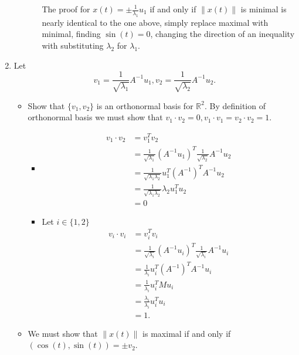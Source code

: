 \documentclass[12pt, letterpaper]{article}
\newcommand{\R}{\mathbb{R}}
\begin{document}
\begin{enumerate}
\begin{itemize}
\begin{itemize}
		The proof for $x(t) = \pm \frac{1}{\lambda_1} u_1$ if and only if $\|x(t)\|$ is minimal is nearly identical to the one above, simply replace maximal with minimal, finding $\sin(t) = 0$, changing the direction of an inequality with substituting $\lambda_2$ for $\lambda_1$.  

			\end{itemize}
		\end{itemize}
		\item Let $$v_1 = \frac{1}{\sqrt{\lambda_1}} A^{-1}u_1, v_2 = \frac{1}{\sqrt{\lambda_2}} A^{-1}u_2.$$
		\begin{itemize}
			\item Show that $\{v_1, v_2\}$ is an orthonormal basis for $\R^2$.  By definition of orthonormal basis we must show that $v_1 \cdot v_2 = 0, v_1 \cdot v_1 = v_2 \cdot v_2 = 1.$
			\begin{itemize}
				\item \begin{align*}
					v_1 \cdot v_2 &= v_1^T v_2\\
					&= \frac{1}{\sqrt{\lambda_1}} (A^{-1}u_1)^T \frac{1}{\sqrt{\lambda_2}} A^{-1}u_2\\
					&= \frac{1}{\sqrt{\lambda_1 \lambda_2}} u_1^T (A^{-1})^TA^{-1} u_2\\
					&= \frac{1}{\sqrt{\lambda_1 \lambda_2}} \lambda_2 u_1^T u_2\\
					&= 0
				\end{align*}
				\item Let $i \in \{1,2\}$ \begin{align*}
					v_i \cdot v_i &= v_i^T v_i\\
					&=  \frac{1}{\sqrt{\lambda_i}} (A^{-1}u_i)^T \frac{1}{\sqrt{\lambda_i}} A^{-1}u_i\\
					&= \frac{1}{\lambda_i}u_i^T (A^{-1})^T A^{-1} u_i\\
					&= \frac{1}{\lambda_i} u_i^T M u_i\\
					&= \frac{\lambda_i}{\lambda_i} u_i^T u_i\\
					&= 1.
				\end{align*} 
			\end{itemize}
			\item We must show that $\|x(t)\|$ is maximal if and only if $(\cos(t), \sin(t)) = \pm v_2$.

\end{itemize}
\end{enumerate}
\end{document}
